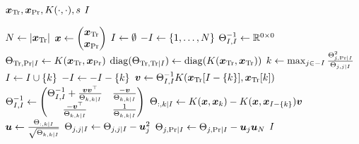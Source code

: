 \begin{algorithmic}[1]
  \REQUIRE \( \bm{x}_{\text{Tr}}, \bm{x}_{\text{Pr}}, K(\cdot, \cdot), s \)
  \ENSURE \( I \)

  \STATE \( N \gets \lvert\bm{x}_{\text{Tr}}\rvert \)
  \STATE \(
    \bm{x} \gets
    \begin{pmatrix}
      \bm{x}_{\text{Tr}} \\
      \bm{x}_{\text{Pr}}
    \end{pmatrix}
  \)
  \STATE \( I \gets \emptyset \)
  \STATE \( -I \gets \{ 1, \dotsc, N \} \)
  \STATE \( \Theta_{I, I}^{-1} \gets \mathbb{R}^{0 \times 0} \)
  \STATE \(
    \Theta_{\text{Tr}, \text{Pr} \mid I} \gets
    K(\bm{x}_{\text{Tr}}, \bm{x}_{\text{Pr}})
  \)
  \STATE \(
    \operatorname{diag}(\Theta_{\text{Tr}, \text{Tr} \mid I}) \gets
    \operatorname{diag}(K(\bm{x}_{\text{Tr}}, \bm{x}_{\text{Tr}}))
  \)
    \STATE \(
      k \gets \max_{j \in -I}
      \frac{\Theta_{j, \text{Pr} \mid I}^2}{\Theta_{j, j \mid I}}
    \)
    \STATE \( I \gets I \cup \{ k \} \)
    \STATE \( -I \gets -I - \{ k \} \)
    \STATE \(
      \bm{v} \gets \Theta_{I, I}^{-1}
        K(\bm{x}_{\text{Tr}}[I - \{ k \}], \bm{x}_{\text{Tr}}[k])
    \)
    \STATE \(
      \Theta_{I, I}^{-1} \gets
      \begin{pmatrix}
        \Theta_{I, I}^{-1} + \frac{\bm{v} \bm{v}^{\top}}{\Theta_{k, k \mid I}} &
        \frac{-\bm{v}}{\Theta_{k, k \mid I}} \\
        \frac{-\bm{v}^{\top}}{\Theta_{k, k \mid I}} &
        \frac{1}{\Theta_{k, k \mid I}}
      \end{pmatrix}
    \)
    \STATE \(
      \Theta_{:, k \mid I} \gets
      K(\bm{x}, \bm{x}_k) -
      K(\bm{x}, \bm{x}_{I - \{ k \}}) \bm{v}
    \)
    \STATE \(
      \bm{u} \gets \frac{\Theta_{:, k \mid I}}{\sqrt{\Theta_{k, k \mid I}}}
    \)
      \STATE \(
        \Theta_{j, j \mid I} \gets
        \Theta_{j, j \mid I} -
        \bm{u}_j^2
      \)
      \STATE \(
        \Theta_{j, \text{Pr} \mid I} \gets
        \Theta_{j, \text{Pr} \mid I} -
        \bm{u}_j \bm{u}_N
      \)
    \ENDFOR
  \ENDWHILE
  \RETURN \( I \)
\end{algorithmic}
